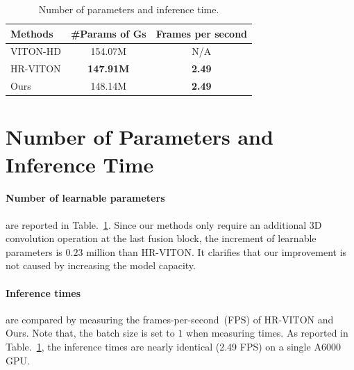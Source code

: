 \begin{table}[t]
	\centering
	\begin{tabular}{l|c|c}
		\toprule
		Methods  & \#Params of Gs & Frames per second \\
		\midrule
		\midrule
        VITON-HD  & 154.07M & N/A \\
        HR-VITON  & \textbf{147.91M} &  \textbf{2.49} \\
        Ours & 148.14M & \textbf{2.49} \\
		\bottomrule
	\end{tabular}
    \caption{Number of parameters and inference time.
    }
	\label{tb_computational_costs}
\end{table}


\section{Number of Parameters and Inference Time}
\paragraph{Number of learnable parameters} are reported in Table.~\ref{tb_computational_costs}. Since our methods only require an additional 3D convolution operation at the last fusion block, the increment of learnable parameters is $0.23$ million than HR-VITON.
It clarifies that our improvement is not caused by increasing the model capacity. 

\paragraph{Inference times} are compared by measuring the frames-per-second~(FPS) of HR-VITON and Ours. Note that, the batch size is set to $1$ when measuring times. As reported in Table.~\ref{tb_computational_costs}, the inference times are nearly identical (2.49 FPS) on a single A6000 GPU.


